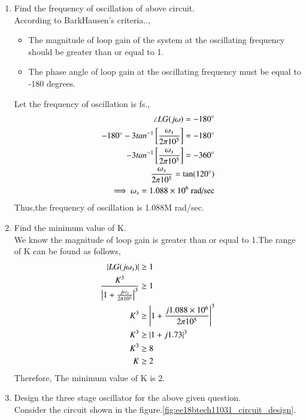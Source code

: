\begin{enumerate}[label=\thesubsection.\arabic*.,ref=\thesubsection.\theenumi]
\item Find the frequency of oscillation of above circuit.\\
\solution According to BarkHausen's criteria..,
\begin{itemize}
    \item The magnitude of loop gain of the system at the oscillating frequency should be greater than or equal to 1.
    \item The phase angle of loop gain at the oscillating frequency must be equal to -180 degrees.
\end{itemize}
Let the frequency of oscillation is fs.,
\begin{align}
    \angle LG(j\omega) = -180\degree\\
    -180\degree - 3tan^{-1}\sbrak{\frac{\omega_s}{2\pi10^5}} = -180\degree \\
    - 3tan^{-1}\sbrak{\frac{\omega_s}{2\pi10^5}} = -360\degree\\
    \frac{\omega_s}{2\pi10^5} =  \tan(120\degree)\\
    \implies \omega_s = 1.088\times10^6\text{ rad/sec}\label{eq:ee18btech11031_frequency}
\end{align}
Thus,the frequency of oscillation is 1.088M rad/sec.
\item Find the minimum value of K.\\
\solution 
We know the magnitude of loop gain is greater than or equal to 1.The range of K can be found as follows,
\begin{align}
    \left\vert LG(j\omega_s)\right\vert &\geq 1 \\
    \frac{K^3}{\left\vert1+\frac{j\omega_s}{2\pi10^5}\right\vert^3} &\geq 1 \\
    K^3 &\geq \left\vert1+\frac{j1.088\times10^6}{2\pi10^5}\right\vert^3\\
     K^3 &\geq \left\vert1+j1.73\right\vert^3\\
     K^3 &\geq 8 \\
     K &\geq 2
\end{align}
Therefore, The minimum value of K is 2.
\item Design the three stage oscillator for the above given question.
\\
\solution Consider the circuit shown in the figure.\ref{fig:ee18btech11031_circuit_design}.\\
\begin{figure}[!hbt]
	\begin{center}
			\resizebox{\columnwidth}{!}{}

\end{center}
\end{figure}
\end{enumerate}
